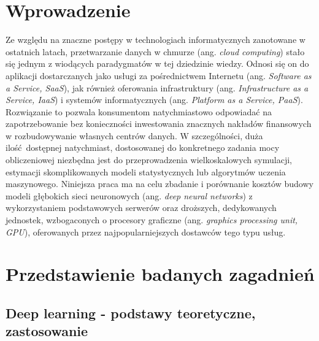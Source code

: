 \documentclass[12pt,a4paper,twoside]{article}
\begin{document}
\clearpage
\thispagestyle{empty}
\mbox{}

\clearpage

\tableofcontents

\clearpage

\section{Wprowadzenie}


Ze względu na znaczne postępy w technologiach informatycznych zanotowane w ostatnich latach, przetwarzanie danych w chmurze (ang. \textit{cloud computing}) stało się jednym z wiodących paradygmatów w tej dziedzinie wiedzy. Odnosi się on do aplikacji dostarczanych jako usługi za pośrednictwem Internetu (ang. \textit{Software as a Service, SaaS}), jak również oferowania infrastruktury (ang. \textit{Infrastructure as a Service, IaaS}) i systemów informatycznych (ang. \textit{Platform as a Service, PaaS}). Rozwiązanie to pozwala konsumentom natychmiastowo odpowiadać na zapotrzebowanie bez konieczności inwestowania znacznych nakładów finansowych w rozbudowywanie własnych centrów danych. W szczególności, duża ilość dostępnej natychmiast, dostosowanej do konkretnego zadania mocy obliczeniowej niezbędna jest do przeprowadzenia wielkoskalowych symulacji, estymacji skomplikowanych modeli statystycznych lub algorytmów uczenia maszynowego. Niniejsza praca ma na celu zbadanie i porównanie kosztów budowy modeli głębokich sieci neuronowych (ang. \textit{deep neural networks}) z wykorzystaniem podstawowych serwerów oraz droższych, dedykowanych jednostek, wzbogaconych o procesory graficzne (ang. \textit{graphics processing unit, GPU}), oferowanych przez najpopularniejszych dostawców tego typu usług.



\clearpage

\section{Przedstawienie badanych zagadnień}

\subsection{Deep learning - podstawy teoretyczne, zastosowanie}
\end{document}
